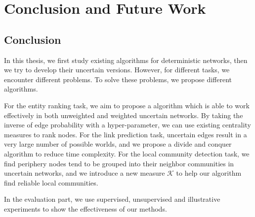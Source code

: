 \documentclass[\main/thesis.tex]{subfiles}
\begin{document}
\chapter{Conclusion and Future Work}

\section{Conclusion}
In this thesis, we first study existing algorithms for deterministic networks, then we try to develop their uncertain versions. However, for different tasks, we encounter different problems. To solve these problems, we propose different algorithms. 

For the entity ranking task, we aim to propose a algorithm which is able to work effectively in both unweighted and weighted uncertain networks. By taking the inverse of edge probability with a hyper-parameter, we can use existing centrality measures to rank nodes. For the link prediction task, uncertain edges result in a very large number of possible worlds, and we propose a divide and conquer algorithm to reduce time complexity. For the local community detection task, we find periphery nodes tend to be grouped into their neighbor communities in uncertain networks, and we introduce a new measure $\mathcal{K}$ to help our algorithm find reliable local communities.

In the evaluation part, we use supervised, unsupervised and illustrative experiments to show the effectiveness of our methods.


\end{document}
